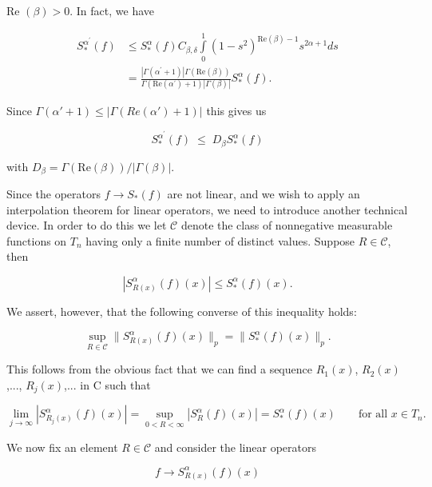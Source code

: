 Re $\left(\beta\right)>0$. In fact, we have

\[
\begin{aligned}S_{*}^{\alpha^{\prime}}(f)&\leq S_{*}^{\alpha}(f)C_{\beta,\delta}\int\limits_{0}^{1}(1-s^{2})^{\text{Re}(\beta)-1}s^{2\alpha+1}ds\\&=\frac{|\Gamma(\alpha^{\prime}+1)|\Gamma(\text{Re}(\beta))}{\Gamma(\text{Re}(\alpha^{\prime})+1)|\Gamma(\beta)|}S_{*}^{\alpha}(f).\end{aligned}
\]

Since $\Gamma(\alpha' + 1) \leq |\Gamma(Re(\alpha') + 1)|$ this gives us

\begin{equation}\label{eq:c7-5-11}
S_{*}^{\alpha^{\prime}}(f)\;\leq\;D_{\beta}S_{*}^{\alpha}(f)
\end{equation}

with $D_{\beta} = \Gamma(\text{Re}(\beta))/|\Gamma(\beta)|$.

Since the operators $f \to S_*(f)$ are not linear, and we wish to apply an interpolation theorem for linear operators, we need to introduce another technical device. In order to do this we let $\mathcal{C}$ denote the class of nonnegative measurable functions on $T_n$ having only a finite number of distinct values. Suppose $R \in \mathcal{C}$, then

\begin{equation}\label{eq:c7-5-12}
|S_{R(x)}^{\alpha}(f)(x)|\leq S_{*}^{\alpha}(f)(x).
\end{equation}

We assert, however, that the following converse of this inequality holds:

\begin{equation}\label{eq:c7-5-13}
\sup_{R\in\mathcal{C}}\|S_{R(x)}^{\alpha}(f)(x)\|_{p}=\|S_{*}^{\alpha}(f)(x)\|_{p}.
\end{equation}

This follows from the obvious fact that we can find a sequence $R_1(x)$, $R_2(x)$,..., $R_j(x)$,... in C such that

\[
\lim_{j\to\infty}\left|S_{R_{j}(x)}^{\alpha}(f)(x)\right|=\sup_{0<R<\infty}\left|S_{R}^{\alpha}(f)(x)\right|=S_{*}^{\alpha}(f)(x)\qquad\text{for all }x\in T_{n}.
\]

We now fix an element $R \in \mathcal{C}$ and consider the linear operators

\begin{equation}\label{eq:c7-5-14}
f\to S_{R(x)}^{\alpha}(f)(x)
\end{equation}


